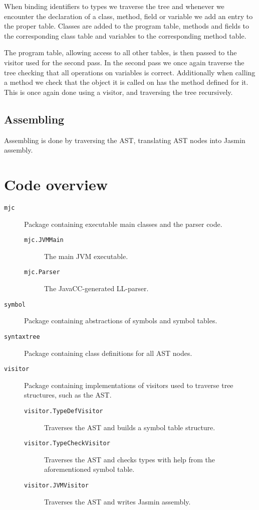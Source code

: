 \documentclass[a4paper]{article}
\begin{document}
When binding identifiers to types we traverse the tree and whenever we encounter
the declaration of a class, method, field or variable we add an entry to the
proper table. Classes are added to the program table, methods and fields to the
corresponding class table and variables to the corresponding method table.

The program table, allowing access to all other tables, is then passed to the
visitor used for the second pass. In the second pass we once again traverse the
tree checking that all operations on variables is correct. Additionally when
calling a method we check that the object it is called on has the method defined
for it. This is once again done using a visitor, and traversing the tree
recursively.

\subsection{Assembling}

Assembling is done by traversing the AST, translating AST nodes into Jasmin
assembly.

\section{Code overview}

\begin{description}
\item[\texttt{mjc}] Package containing executable main classes and the parser
    code.
    \begin{description}
        \item[\texttt{mjc.JVMMain}] The main JVM executable.
        \item[\texttt{mjc.Parser}] The JavaCC-generated LL-parser.
    \end{description}
\item[\texttt{symbol}] Package containing abstractions of symbols and symbol
    tables.
\item[\texttt{syntaxtree}] Package containing class definitions for all AST
    nodes.
\item[\texttt{visitor}] Package containing implementations of visitors used to
    traverse tree structures, such as the AST.
    \begin{description}
        \item[\texttt{visitor.TypeDefVisitor}] Traverses the AST and builds
            a symbol table structure.
        \item[\texttt{visitor.TypeCheckVisitor}] Traverses the AST and checks
            types with help from the aforementioned symbol table.
        \item[\texttt{visitor.JVMVisitor}] Traverses the AST and writes Jasmin
            assembly.
    \end{description}
\end{description}
\end{document}

